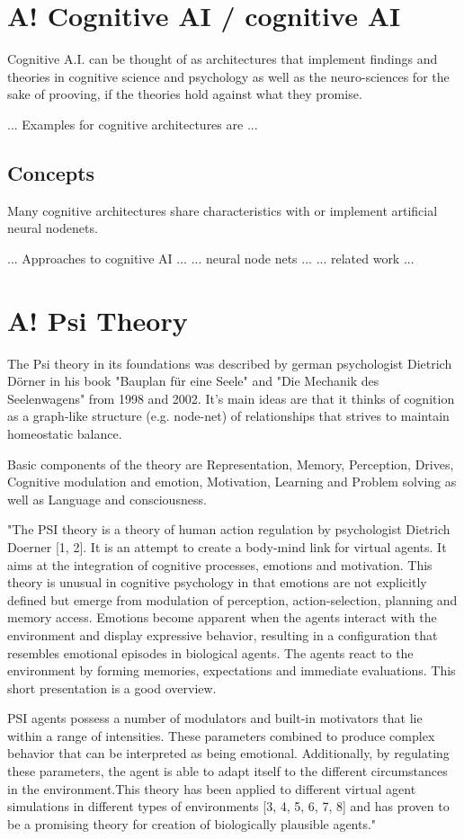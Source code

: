 \section{A! Cognitive AI / cognitive AI}
Cognitive A.I. can be thought of as architectures that implement findings and theories in cognitive science and psychology as well as the neuro-sciences for the sake of prooving, if the theories hold against what they promise. 

... Examples for cognitive architectures are ...
\subsection{Concepts}
Many cognitive architectures share characteristics with or implement artificial neural nodenets.

... Approaches to cognitive AI ...
... neural node nets ...
... related work ...

\section{A! Psi Theory}
The Psi theory in its foundations was described by german psychologist Dietrich Dörner in his book "Bauplan für eine Seele" and "Die Mechanik des Seelenwagens" from 1998 and 2002. It's main ideas are that it thinks of cognition as a graph-like structure (e.g. node-net) of relationships that strives to maintain homeostatic balance.\cite{Bach:2009:PSI:1611304}

Basic components of the theory are Representation, Memory, Perception, Drives, Cognitive modulation and emotion, Motivation, Learning and Problem solving as well as Language and consciousness.

"The PSI theory is a theory of human action regulation by psychologist Dietrich Doerner [1, 2]. It is an attempt to create a body-mind link for virtual agents. It aims at the integration of cognitive processes, emotions and motivation. This theory is unusual in cognitive psychology in that emotions are not explicitly defined but emerge from modulation of perception, action-selection, planning and memory access. Emotions become apparent when the agents interact with the environment and display expressive behavior, resulting in a configuration that resembles emotional episodes in biological agents. The agents react to the environment by forming memories, expectations and immediate evaluations. This short presentation is a good overview.

PSI agents possess a number of modulators and built-in motivators that lie within a range of intensities. These parameters combined to produce complex behavior that can be interpreted as being emotional. Additionally, by regulating these parameters, the agent is able to adapt itself to the different circumstances in the environment.This theory has been applied to different virtual agent simulations in different types of environments [3, 4, 5, 6, 7, 8] and has proven to be a promising theory for creation of biologically plausible agents."


